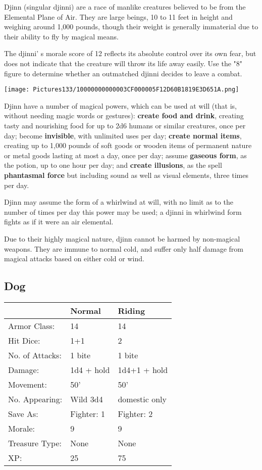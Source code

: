 \documentclass[a4paper,twoside,openany,10pt]{book}
\begin{document}
\begin{multicols}{2}
Djinn (singular djinni) are a race of manlike creatures believed to be from the Elemental Plane of Air. They are large beings, 10 to 11 feet in height and weighing around 1,000 pounds, though their weight is generally immaterial due to their ability to fly by magical means.

The djinni' s morale score of 12 reflects its absolute control over its own fear, but does not indicate that the creature will throw its life away easily. Use the "8" figure to determine whether an outmatched djinni decides to leave a combat.


\begin{center}
	\texttt{[image: Pictures133/10000000000003CF000005F12D60B1819E3D651A.png]}
\end{center}

Djinn have a number of magical powers, which can be used at will (that is, without needing magic words or gestures): \textbf{create food and drink}, creating tasty and nourishing food for up to 2d6 humans or similar creatures, once per day; become \textbf{invisible}, with unlimited uses per day; \textbf{create normal items}, creating up to 1,000 pounds of soft goods or wooden items of permanent nature or metal goods lasting at most a day, once per day; assume \textbf{gaseous form}, as the potion, up to one hour per day; and \textbf{create illusions}, as the spell \textbf{phantasmal force} but including sound as well as visual elements, three times per day.

Djinn may assume the form of a whirlwind at will, with no limit as to the number of times per day this power may be used; a djinni in whirlwind form fights as if it were an air elemental.

Due to their highly magical nature, djinn cannot be harmed by non-magical weapons. They are immune to normal cold, and suffer only half damage from magical attacks based on either cold or wind.

\subsection*{Dog}\label{dog}

\begin{tabularx}{0.48\textwidth}{lXX}
& Normal & Riding \\\hline
Armor Class: & 14 & 14 \\\hline
Hit Dice: & 1+1 & 2 \\\hline
No. of Attacks: & 1 bite & 1 bite \\\hline
Damage: & 1d4 + hold & 1d4+1 + hold \\\hline
Movement: & 50' & 50' \\\hline
No. Appearing: & Wild 3d4 & domestic only \\\hline
Save As: & Fighter: 1 & Fighter: 2 \\\hline
Morale: & 9 & 9 \\\hline
Treasure Type: & None & None \\\hline
XP: & 25 & 75 \\\hline
\end{tabularx}\medskip


\end{multicols}
\end{document}
